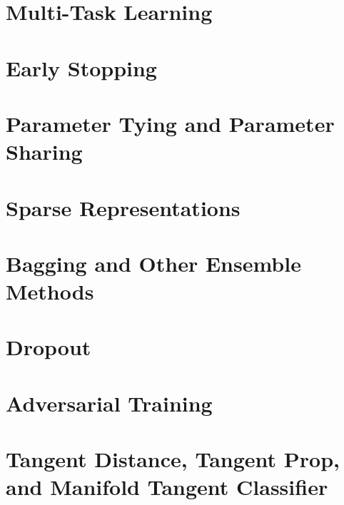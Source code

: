 \documentclass{article}
\begin{document}

\section{Multi-Task Learning}


\section{Early Stopping}

\section{Parameter Tying and Parameter Sharing}


\section{Sparse Representations}

\section{Bagging and Other Ensemble Methods}

\section{Dropout}

\section{Adversarial Training}

\section{Tangent Distance, Tangent Prop, and Manifold Tangent Classifier}





\end{document}
